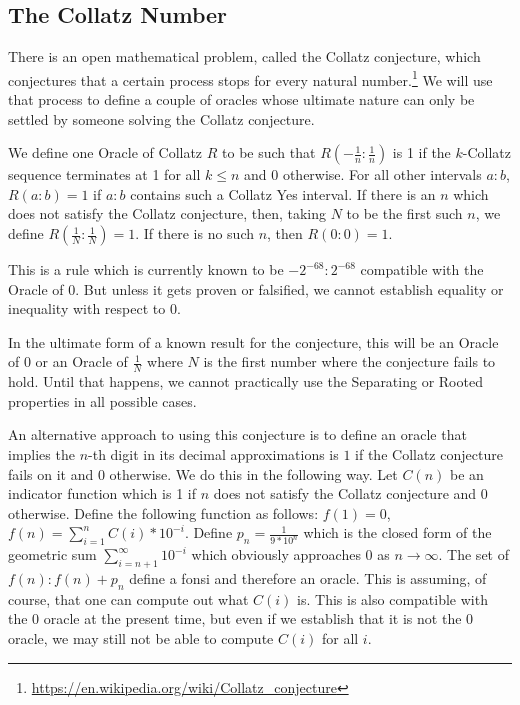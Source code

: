 \documentclass[12pt]{article}
\begin{document}
\subsection{The Collatz Number}

There is an open mathematical problem, called the Collatz conjecture, which conjectures that a certain process stops for every natural number.\footnote{\url{https://en.wikipedia.org/wiki/Collatz_conjecture}} We will use that process to define a couple of oracles whose ultimate nature can only be settled by someone solving the Collatz conjecture. 

We define one Oracle of Collatz $R$ to be such that $R(-\tfrac{1}{n}:\tfrac{1}{n})$ is 1 if the $k$-Collatz sequence terminates at 1 for all $k \leq n$ and 0 otherwise. For all other intervals $a:b$, $R(a:b) = 1$ if $a:b$ contains such a Collatz Yes interval. If there is an $n$ which does not satisfy the Collatz conjecture, then, taking $N$ to be the first such $n$, we define $R(\tfrac{1}{N}:\tfrac{1}{N}) = 1$. If there is no such $n$, then $R(0:0) = 1$.

This is a rule which is currently known to be $-2^{-68}:2^{-68}$ compatible with the Oracle of 0. But unless it gets proven or falsified, we cannot establish equality or inequality with respect to 0. 

In the ultimate form of a known result for the conjecture, this will be an Oracle of 0 or an Oracle of $\tfrac{1}{N}$ where $N$ is the first number where the conjecture fails to hold. Until that happens, we cannot practically use the Separating or Rooted properties in all possible cases. 

An alternative approach to using this conjecture is to define an oracle that implies the $n$-th digit in its decimal approximations is $1$ if the Collatz conjecture fails on it and $0$ otherwise. We do this in the following way. Let $C(n)$ be an indicator function which is 1 if $n$ does not satisfy the Collatz conjecture and 0 otherwise. Define the following function as follows: $f(1) = 0$,  $f(n) = \sum_{i=1}^n C(i)*10^{-i} $. Define $p_n = \frac{1}{9*10^n}$ which is the closed form of the geometric sum $\sum_{i=n+1}^{\infty} 10^{-i}$ which obviously approaches $0$ as $n \to \infty$. The set of $f(n): f(n) + p_n $ define a fonsi and therefore an oracle. This is assuming, of course, that one can compute out what $C(i)$ is. This is also compatible with the 0 oracle at the present time, but even if we establish that it is not the 0 oracle, we may still not be able to compute $C(i)$ for all $i$. 
\end{document}
